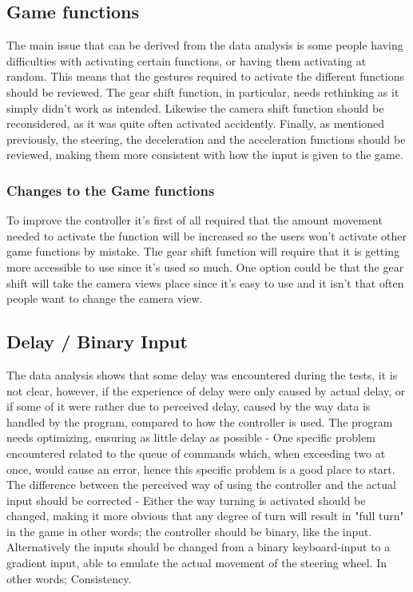 \subsection{Game functions}
The main issue that can be derived from the data analysis is some people having difficulties with activating certain functions, or having them activating at random. This means that the gestures required to activate the different functions should be reviewed.
The gear shift function, in particular, needs rethinking as it simply didn't work as intended. Likewise the camera shift function should be reconsidered, as it was quite often activated accidently. Finally, as mentioned previously, the steering, the deceleration and the acceleration functions should be reviewed, making them more consistent with how the input is given to the game.

\subsubsection*{Changes to the Game functions}
To improve the controller it’s first of all required that the amount movement needed to activate the function will be increased so the users won’t activate other game functions by mistake. The gear shift function will require that it is getting more accessible to use since it’s used so much. One option could be that the gear shift will take the camera views place since it’s easy to use and it isn’t that often people want to change the camera view.


\subsection{Delay / Binary Input}
The data analysis shows that some delay was encountered during the tests, it is not clear, however, if the experience of delay were only caused by actual delay, or if some of it were rather due to perceived delay, caused by the way data is handled by the program, compared to how the controller is used.
The program needs optimizing, ensuring as little delay as possible - One specific problem encountered related to the queue of commands which, when exceeding two at once, would cause an error, hence this specific problem is a good place to start.
The difference between the perceived way of using the controller and the actual input should be corrected - Either the way turning is activated should be changed, making it more obvious that any degree of turn will result in "full turn" in the game in other words; the controller should be binary, like the input. Alternatively the inputs should be changed from a binary keyboard-input to a gradient input, able to emulate the actual movement of the steering wheel. In other words; Consistency.

